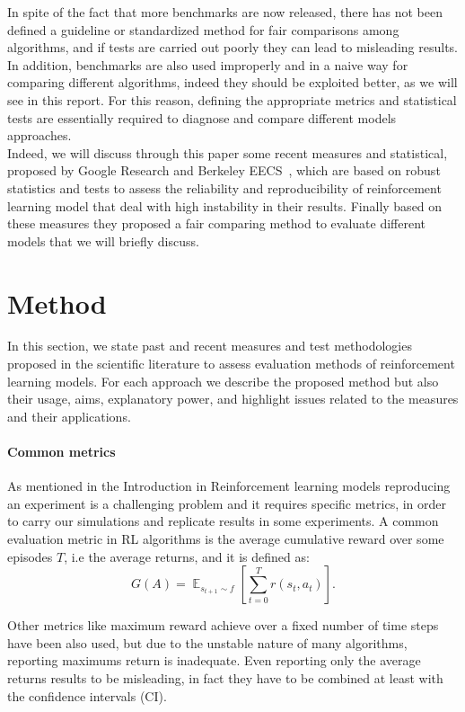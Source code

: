 \documentclass{article}
\DeclareMathOperator{\EX}{\mathbb{E}}%
\begin{document}
In spite of the fact that more benchmarks are now released, there has not been defined a guideline or standardized method for fair comparisons among algorithms, and if tests are carried out poorly they can lead to misleading results. In addition, benchmarks are also used improperly and in a naive way for comparing different algorithms, indeed they should be exploited better, as we will see in this report.
For this reason, defining the appropriate metrics and statistical tests are essentially required to diagnose and compare different models approaches.\\
Indeed, we will discuss through this paper some recent measures and statistical, proposed by Google Research and Berkeley EECS~\cite{GoogleMeasure}, which are based on robust statistics and tests to assess the reliability and reproducibility of reinforcement learning model that deal with high instability in their results. Finally based on these measures they proposed a fair comparing method to evaluate different models that we will briefly discuss.
\section{Method}
In this section, we state past and recent measures and test methodologies proposed in the scientific literature to assess evaluation methods of reinforcement learning models. For each approach we describe the proposed method but also their usage, aims, explanatory power, and highlight issues related to the measures and their applications.
\paragraph{Common metrics}
As mentioned in the Introduction in Reinforcement learning models reproducing an experiment is a challenging problem and it requires specific metrics, in order to carry our simulations and replicate results in some experiments.
A common evaluation metric in RL algorithms is the average cumulative reward over some episodes $T$, i.e the average returns, and it is defined as:	
\begin{equation}
G(A) = \EX_{s_{t+1} \sim f} \left[\sum_{t=0}^{T} r(s_t, a_t)\right].	
\end{equation}

Other metrics like maximum reward achieve over a fixed number of time steps have been also used, but  due to the unstable nature of many algorithms, reporting maximums return is inadequate. Even reporting only the average returns results to be misleading, in fact they have to be combined at least with the confidence intervals (CI).
\end{document}
